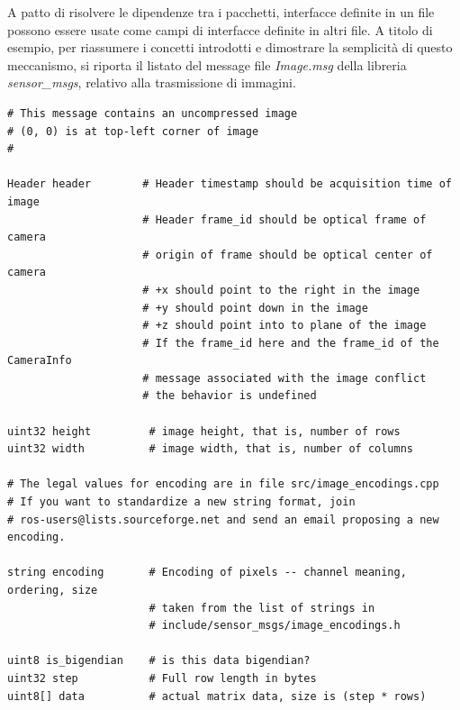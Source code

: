A patto di risolvere le dipendenze tra i pacchetti, interfacce definite in un file possono essere usate come campi di interfacce definite in altri file.\newpage
A titolo di esempio, per riassumere i concetti introdotti e dimostrare la semplicità di questo meccanismo, si riporta il listato del message file \emph{Image.msg} della libreria \emph{sensor\_msgs}, relativo alla trasmissione di immagini.
\vspace{1cm}
\begin{lstlisting}[caption=Definizione del messaggio \emph{sensor\_msgs/Image}.]
# This message contains an uncompressed image
# (0, 0) is at top-left corner of image
#

Header header        # Header timestamp should be acquisition time of image
                     # Header frame_id should be optical frame of camera
                     # origin of frame should be optical center of camera
                     # +x should point to the right in the image
                     # +y should point down in the image
                     # +z should point into to plane of the image
                     # If the frame_id here and the frame_id of the CameraInfo
                     # message associated with the image conflict
                     # the behavior is undefined

uint32 height         # image height, that is, number of rows
uint32 width          # image width, that is, number of columns

# The legal values for encoding are in file src/image_encodings.cpp
# If you want to standardize a new string format, join
# ros-users@lists.sourceforge.net and send an email proposing a new encoding.

string encoding       # Encoding of pixels -- channel meaning, ordering, size
                      # taken from the list of strings in
                      # include/sensor_msgs/image_encodings.h

uint8 is_bigendian    # is this data bigendian?
uint32 step           # Full row length in bytes
uint8[] data          # actual matrix data, size is (step * rows)
\end{lstlisting}
\newpage

